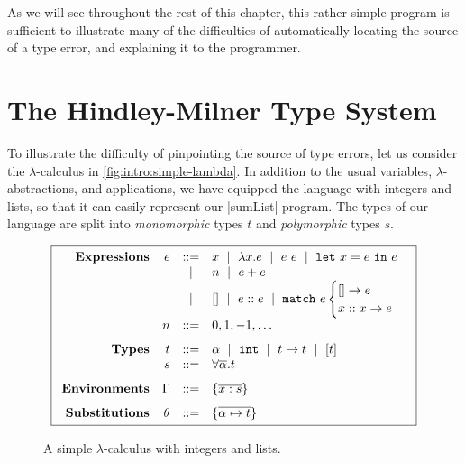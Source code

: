 As we will see throughout the rest of this chapter, this rather simple
program is sufficient to illustrate many of the difficulties of
automatically locating the source of a type error, and explaining it to
the programmer.

\section{The Hindley-Milner Type System}
\label{sec:intro:simple-type}

To illustrate the difficulty of pinpointing the source of type errors,
let us consider the $\lambda$-calculus in
\autoref{fig:intro:simple-lambda}.
%
In addition to the usual variables, $\lambda$-abstractions, and
applications, we have equipped the language with integers and lists, so
that it can easily represent our |sumList| program.
%
The types of our language are split into \emph{monomorphic} types $t$
and \emph{polymorphic} types $s$.
%

\begin{figure}
\centering
\[
\boxed{
\begin{array}{rrcl}
\mathbf{Expressions}
& e & ::=    & x \spmid \efun{x}{e} \spmid \eapp{e}{e} \spmid \elet{x}{e}{e} \\
&   & \spmid & n \spmid \eplus{e}{e}\\
&   & \spmid & \enil \spmid \econs{e}{e} \spmid \elcase{e}{e}{x}{x}{e} \\[0.1in]

& n & ::= &  0, 1, -1, \ldots \\[0.1in]

\mathbf{Types}
& t & ::= & \alpha \spmid %
            \tint \spmid \tarr{t}{t} \spmid %
            \tlist{t} \\
& s & ::= & \forall \overline{\alpha}. t \\[0.1in]

\mathbf{Environments}
& \Gamma & ::= & \{\overline{x:s}\}
\\[0.1in]

\mathbf{Substitutions}
& \tsu & ::= & \{\overline{\alpha \mapsto t}\}
\\
\end{array}
}
\]
\caption{A simple $\lambda$-calculus with integers and lists.}
\label{fig:intro:simple-lambda}
\end{figure}


